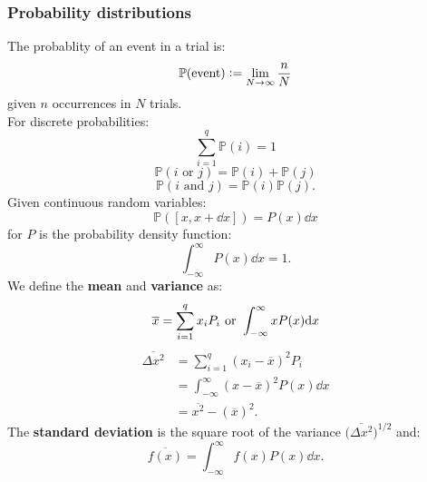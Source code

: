 \documentclass{article}
\newcommand{\deq}{\vcentcolon=}
\newcommand{\pr}{\mathbb{P}}
\begin{document}
\begin{multicols*}{3}
\noindent

\subsubsection*{Probability distributions}
The probablity of an event in a trial is:
$$\pr(\text{event})\deq\lim_{N\rightarrow\infty}\frac{n}{N}$$
given $n$ occurrences in $N$ trials. \\
For discrete probabilities:
$$\sum_{i=1}^{q}\pr(i)=1$$
$$\pr(\text{$i$ or $j$})=\pr(i)+\pr(j)$$
$$\pr(\text{$i$ and $j$})=\pr(i)\pr(j).$$
Given continuous random variables:
$$\pr([x,x+\dd x])=P(x)\dd x$$
for $P$ is the probability density function:
$$\int_{-\infty}^{\infty}P(x)\dd x=1.$$
We define the \textbf{mean} and \textbf{variance} as:
$$\overline{x}=\sum_{i=1}^{q}x_i P_i
\hspace{0.05in}\text{or}\hspace{0.05in}
\int_{-\infty}^{\infty}xP(x)\dd x$$
\begin{align*}
    \overline{\Delta x^2}
    &=\sum_{i=1}^{q}(x_i-\overline{x})^2 P_i \\
    &=\int_{-\infty}^{\infty}
    (x-\overline{x})^2P(x)\dd x \\
    &=\overline{x^2}-(\overline{x})^2.
\end{align*}
The \textbf{standard deviation} is the square root
of the variance $\bigl(\overline{\Delta x^2}\bigr)^{1/2}$ and:
$$\overline{f(x)}=
\int_{-\infty}^{\infty}f(x)P(x)\dd x.$$


\end{multicols*}
\end{document}

